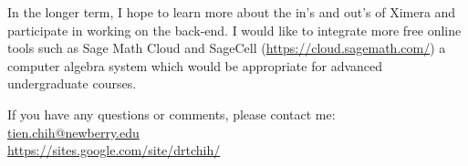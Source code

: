 \documentclass{ximera}
\begin{document}
In the longer term, I hope to learn more about the in's and out's of Ximera and participate in working on the back-end.  I would like to integrate more free online tools such as Sage Math Cloud and SageCell (\url{https://cloud.sagemath.com/}) a computer algebra system which would be appropriate for advanced undergraduate courses.

If you have any questions or comments, please contact me:\\
\href{mailto:tien.chih@newberry.edu}{tien.chih@newberry.edu}\\
\url{https://sites.google.com/site/drtchih/}
\end{document}
